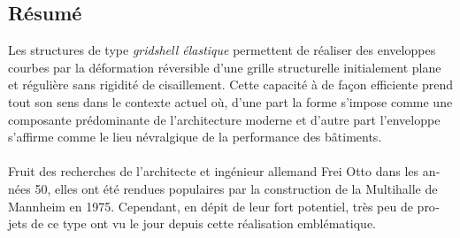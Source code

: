 \begin{otherlanguage}{french}
\cleardoublepage
\chapter*{Résumé}
Les structures de type \emph{gridshell élastique} permettent de réaliser des enveloppes courbes par la déformation réversible d'une grille structurelle initialement plane et régulière sans rigidité de cisaillement. Cette capacité à  de façon efficiente prend tout son sens dans le contexte actuel où, d’une part la forme s'impose comme une composante prédominante de l'architecture moderne et d’autre part l'enveloppe s'affirme comme le lieu névralgique de la performance des bâtiments.
\\
\\
Fruit des recherches de l'architecte et ingénieur allemand Frei Otto dans les années 50, elles ont été rendues populaires par la construction de la Multihalle de Mannheim en 1975. Cependant, en dépit de leur fort potentiel, très peu de projets de ce type ont vu le jour depuis cette réalisation emblématique. 



\end{otherlanguage}
